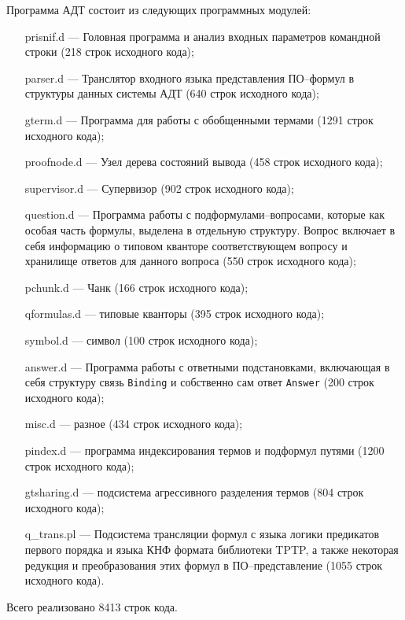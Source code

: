 Программа АДТ состоит из следующих программных модулей:
\begin{enumerate}
\item[prisnif.d] --- Головная программа и анализ входных параметров командной строки (218 строк исходного кода);
\item[parser.d] --- Транслятор входного языка представления ПО--формул в структуры данных системы АДТ (640 строк исходного кода);
\item[gterm.d] --- Программа для работы с обобщенными термами (1291 строк исходного кода);
\item[proofnode.d] --- Узел дерева состояний вывода (458 строк исходного кода);
\item[supervisor.d] --- Супервизор (902 строк исходного кода);
\item[question.d] --- Программа работы с подформулами--вопросами, которые как особая часть формулы, выделена в отдельную структуру. Вопрос включает в себя информацию о типовом кванторе соответствующем вопросу и хранилище ответов для данного вопроса (550 строк исходного кода);
\item[pchunk.d] --- Чанк (166 строк исходного кода);
\item[qformulas.d] --- типовые кванторы (395 строк исходного кода);
\item[symbol.d] --- символ (100 строк исходного кода);
\item[answer.d] --- Программа работы с ответными подстановками, включающая в себя структуру связь \texttt{Binding} и собственно сам ответ \texttt{Answer} (200 строк исходного кода);
\item[misc.d] --- разное (434 строк исходного кода);
\item[pindex.d] --- программа индексирования термов и подформул путями (1200 строк исходного кода);
\item[gtsharing.d] --- подсистема агрессивного разделения термов (804 строк исходного кода);
\item[q\_trans.pl] --- Подсистема трансляции формул с языка логики предикатов первого порядка и языка КНФ формата библиотеки TPTP, а также некоторая редукция и преобразования этих формул в ПО--представление (1055 строк исходного кода).
\end{enumerate}
Всего реализовано 8413 строк кода.




